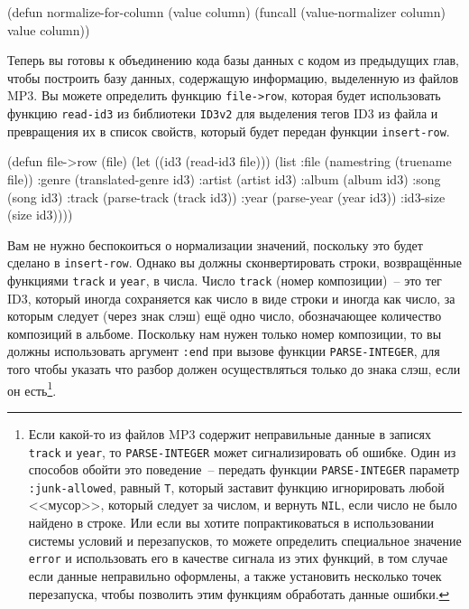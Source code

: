 \begin{myverb}
(defun normalize-for-column (value column)
  (funcall (value-normalizer column) value column))
\end{myverb}

Теперь вы готовы к объединению кода базы данных с кодом из предыдущих глав, чтобы
построить базу данных, содержащую информацию, выделенную из файлов MP3.  Вы можете
определить функцию \lstinline{file->row}, которая будет использовать функцию \lstinline{read-id3} из
библиотеки \lstinline{ID3v2} для выделения тегов ID3 из файла и превращения их в список
свойств, который будет передан функции \lstinline{insert-row}.

\begin{myverb}
(defun file->row (file)
  (let ((id3 (read-id3 file)))
    (list
     :file   (namestring (truename file))
     :genre  (translated-genre id3)
     :artist (artist id3)
     :album  (album id3)
     :song   (song id3)
     :track  (parse-track (track id3))
     :year   (parse-year (year id3))
     :id3-size (size id3))))
\end{myverb}

Вам не нужно беспокоиться о нормализации значений, поскольку это будет сделано в
\lstinline{insert-row}.  Однако вы должны сконвертировать строки, возвращённые функциями
\lstinline{track} и \lstinline{year}, в числа.  Число \lstinline{track} (номер композиции)~-- это тег ID3,
который иногда сохраняется как число в виде строки и иногда как число, за которым следует
(через знак слэш) ещё одно число, обозначающее количество композиций в альбоме.  Поскольку
нам нужен только номер композиции, то вы должны использовать аргумент \lstinline{:end} при
вызове функции \lstinline{PARSE-INTEGER}, для того чтобы указать что разбор должен
осуществляться только до знака слэш, если он есть\footnote{Если какой-то из файлов MP3
  содержит неправильные данные в записях \lstinline{track} и \lstinline{year}, то
  \lstinline{PARSE-INTEGER} может сигнализировать об ошибке. Один из способов обойти это
  поведение~-- передать функции \lstinline{PARSE-INTEGER} параметр \lstinline{:junk-allowed}, равный
  \lstinline{T}, который заставит функцию игнорировать любой <<мусор>>, который следует за
  числом, и вернуть \lstinline{NIL}, если число не было найдено в строке.  Или если вы хотите
  попрактиковаться в использовании системы условий и перезапусков, то можете определить
  специальное значение \lstinline{error} и использовать его в качестве сигнала из этих функций,
  в том случае если данные неправильно оформлены, а также установить несколько точек
  перезапуска, чтобы позволить этим функциям обработать данные ошибки.}.

